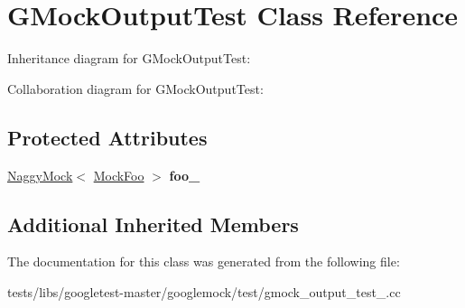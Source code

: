 \hypertarget{classGMockOutputTest}{}\section{G\+Mock\+Output\+Test Class Reference}
\label{classGMockOutputTest}


Inheritance diagram for G\+Mock\+Output\+Test\+:


Collaboration diagram for G\+Mock\+Output\+Test\+:
\subsection*{Protected Attributes}
\begin{DoxyCompactItemize}
\item 
\mbox{\label{classGMockOutputTest_aed97d2ca515d69466968c60575cc18a2}} 
\hyperlink{classtesting_1_1NaggyMock}{Naggy\+Mock}$<$ \hyperlink{classMockFoo}{Mock\+Foo} $>$ {\bfseries foo\+\_\+}
\end{DoxyCompactItemize}
\subsection*{Additional Inherited Members}


The documentation for this class was generated from the following file\+:\begin{DoxyCompactItemize}
\item 
tests/libs/googletest-\/master/googlemock/test/gmock\+\_\+output\+\_\+test\+\_\+.\+cc\end{DoxyCompactItemize}
